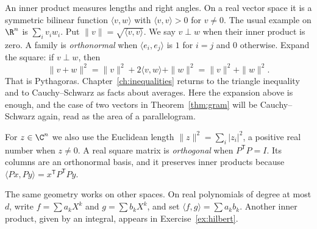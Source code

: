 An inner product measures lengths and right angles. On a real vector space it is a symmetric bilinear function $\langle v,w\rangle$ with $\langle v,v\rangle>0$ for $v\ne0$. The usual example on $\R^n$ is $\sum_iv_iw_i$. Put $\|v\|=\sqrt{\langle v,v\rangle}$. We say $v\perp w$ when their inner product is zero. A family is \emph{orthonormal} when $\langle e_i,e_j\rangle$ is $1$ for $i=j$ and $0$ otherwise. Expand the square: if $v\perp w$, then
\[
\|v+w\|^2=\|v\|^2+2\langle v,w\rangle+\|w\|^2=\|v\|^2+\|w\|^2.
\]
That is Pythagoras. Chapter~\ref{ch:inequalities} returns to the triangle inequality and to Cauchy--Schwarz as facts about averages. Here the expansion above is enough, and the case of two vectors in Theorem~\ref{thm:gram} will be Cauchy--Schwarz again, read as the area of a parallelogram.

For $z\in\C^n$ we also use the Euclidean length $\|z\|^2=\sum_i|z_i|^2$, a positive real number when $z\ne0$. A real square matrix is \emph{orthogonal} when $P^{\mathsf T}P=I$. Its columns are an orthonormal basis, and it preserves inner products because $\langle Px,Py\rangle=x^{\mathsf T}P^{\mathsf T}Py$.

The same geometry works on other spaces. On real polynomials of degree at most $d$, write $f=\sum a_kX^k$ and $g=\sum b_kX^k$, and set $\langle f,g\rangle=\sum a_kb_k$. Another inner product, given by an integral, appears in Exercise~\ref{ex:hilbert}.

